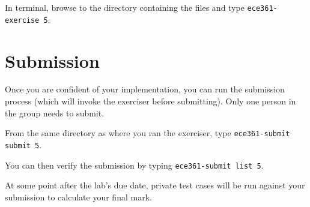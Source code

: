 \documentclass[11pt]{article}
\def\thelab{5}
\begin{document}
In terminal, browse to the directory containing the files and type \texttt{ece361-exercise \thelab}.


\section{Submission}
\label{sec:submission}
Once you are confident of your implementation, you can run the submission process (which will invoke the exerciser before submitting).
Only one person in the group needs to submit.

From the same directory as where you ran the exerciser, type \texttt{ece361-submit submit \thelab}.

You can then verify the submission by typing \texttt{ece361-submit list \thelab}.

At some point after the lab's due date, private test cases will be run against your submission to calculate your final mark.
\end{document}
